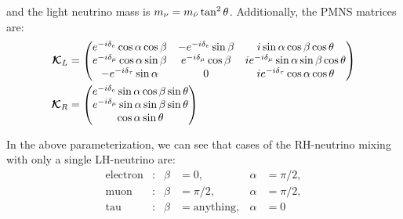 and the light neutrino mass is \(m_{\nu} = m_{\bar{\nu}}\tan^2\theta\). Additionally, the
PMNS matrices are:
\begin{align}
	\bm{\cK}_{L}
	                                      &
	=
	\mqty(
	e^{-i\delta_{e}}\cos\alpha\cos\beta   &
	-e^{-i\delta_{e}}\sin\beta            &
	i \sin\alpha\cos\beta\cos\theta                   \\
	e^{-i\delta_{\mu}}\cos\alpha\sin\beta &
	e^{-i\delta_{\mu}}\cos\beta           &
	i e^{-i\delta_{\mu}}\sin\alpha\sin\beta\cos\theta \\
	-e^{-i\delta_{\tau}}\sin\alpha        &
	0                                     &
	i e^{-i\delta_{\tau}}\cos\alpha\cos\theta
	)                                                 \\
	\bm{\cK}_{R}
	                                      &
	=
	\mqty(
	e^{-i\delta_{e}}\sin\alpha\cos\beta\sin\theta     \\
	e^{-i\delta_{\mu}}\sin\alpha\sin\beta\sin\theta   \\
	\cos\alpha\sin\theta                              \\
	)
\end{align}




In the above parameterization, we can see that cases of the RH-neutrino mixing with only
a single LH-neutrino are:
\begin{align}
	\text{electron} & : & \beta & =0,                 & \alpha & =\pi/2, \\
	\text{muon}     & : & \beta & =\pi/2,             & \alpha & =\pi/2, \\
	\text{tau}      & : & \beta & =\mathrm{anything}, & \alpha & =0
\end{align}
